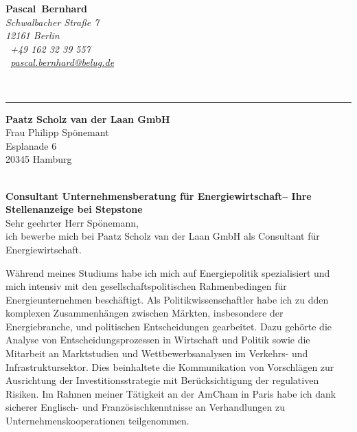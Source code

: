 \documentclass[11pt,a4paper]{article}
\def\firstname{Pascal}
\def\familyname{Bernhard}
\begin{document}
\sffamily   %
\hfill%
\begin{minipage}[t]{.6\textwidth}
	\raggedleft%
	{\bfseries {\color{firstnamecolor}\firstname}~{\color{familynamecolor}\familyname}}\\[.35ex]
	\small\itshape%
	Schwalbacher Straße 7\\
	12161 Berlin\\[.35ex]
	\Mobilefone~+49 162 32 39 557 \\
	\Letter~\href{mailto:pascal.bernhard@belug.de}{pascal.bernhard@belug.de}
\end{minipage}\\[0.5em]
%
{\color{firstnamecolor}\rule{\textwidth}{.25ex}}
%
\begin{minipage}[t]{.4\textwidth}
	\raggedright%
	\vspace*{1em}
	\textbf{Paatz Scholz van der Laan GmbH} \\
	Frau Philipp Spönemant \\[.35ex]
	\small%
	Esplanade 6\\
	20345 Hamburg
\end{minipage}
%
\hfill
%
\begin{minipage}[t]{.4\textwidth}
	\raggedleft %
\end{minipage}\\[1em]


{\bfseries \color{familynamecolor}Consultant Unternehmensberatung für Energiewirtschaft-- Ihre Stellenanzeige bei Stepstone}\\[0.75em]

Sehr geehrter Herr Spönemann,\\[0.5em]
%
ich bewerbe mich bei Paatz Scholz van der Laan GmbH als Consultant für Energiewirtschaft.

Während meines Studiums habe ich mich auf Energiepolitik spezialisiert und mich intensiv mit den gesellschaftspolitischen Rahmenbedingen für Energieunternehmen beschäftigt. Als Politikwissenschaftler habe ich zu dden komplexen Zusammen­hängen zwischen Märkten, insbesondere der Energiebranche, und politischen Entscheidungen gearbeitet. Dazu gehörte die Analyse von Entscheidungsprozessen in Wirtschaft und Politik sowie die Mitarbeit an Marktstudien und Wettbewerbsanalysen im Verkehrs- und Infrastruktursektor. Dies beinhaltete die Kommunikation von Vorschlägen zur Ausrichtung der Investitionsstrategie mit Berücksichtigung der regulativen Risiken. Im Rahmen meiner Tätigkeit an der AmCham in Paris habe ich dank sicherer Englisch- und Französischkenntnisse an Verhandlungen zu Unternehmenskooperationen teilgenommen. 
\end{document}
